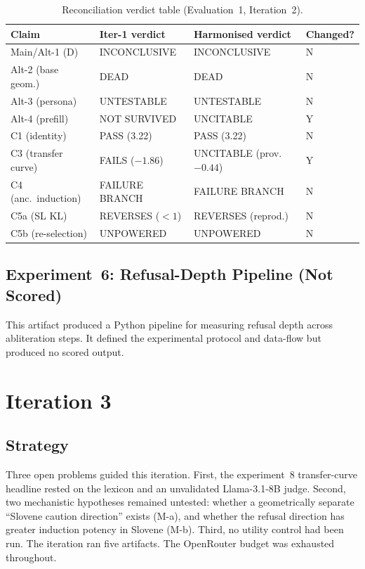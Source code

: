\documentclass[11pt,letterpaper]{article}
\begin{document}
\begin{table}[!htbp]
\centering
\caption{Reconciliation verdict table (Evaluation~1, Iteration~2).}
\label{tab:reconciliation}
\begin{tabularx}{\linewidth}{llll}
\toprule
Claim & Iter-1 verdict & Harmonised verdict & Changed? \\
\midrule
Main/Alt-1 (D) & INCONCLUSIVE & INCONCLUSIVE & N \\
Alt-2 (base geom.) & DEAD & DEAD & N \\
Alt-3 (persona) & UNTESTABLE & UNTESTABLE & N \\
Alt-4 (prefill) & NOT SURVIVED & UNCITABLE & Y \\
C1 (identity) & PASS (3.22) & PASS (3.22) & N \\
C3 (transfer curve) & FAILS ($-1.86$) & UNCITABLE (prov.\ $-0.44$) & Y \\
C4 (anc.\ induction) & FAILURE BRANCH & FAILURE BRANCH & N \\
C5a (SL KL) & REVERSES ($< 1$) & REVERSES (reprod.) & N \\
C5b (re-selection) & UNPOWERED & UNPOWERED & N \\
\bottomrule
\end{tabularx}
\end{table}

\subsection{Experiment~6: Refusal-Depth Pipeline (Not Scored)}
\label{gen_art_experiment_6}

This artifact produced a Python pipeline for measuring refusal depth across abliteration steps. It defined the experimental protocol and data-flow but produced no scored output.


\section{Iteration 3}

\subsection{Strategy}

Three open problems guided this iteration. First, the experiment~8 transfer-curve headline rested on the lexicon and an unvalidated Llama-3.1-8B judge. Second, two mechanistic hypotheses remained untested: whether a geometrically separate ``Slovene caution direction'' exists (M-a), and whether the refusal direction has greater induction potency in Slovene (M-b). Third, no utility control had been run. The iteration ran five artifacts. The OpenRouter budget was exhausted throughout.
\end{document}
